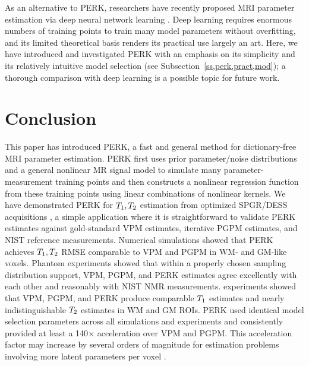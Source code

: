 As an alternative to PERK,
researchers have recently proposed
MRI parameter estimation 
via deep neural network learning
\cite{cohen:17:dlf-arxiv,virtue:17:btr}.
Deep learning requires 
enormous numbers of training points
to train many model parameters without overfitting,
and its limited theoretical basis
renders its practical use largely an art.
Here,
we have introduced and investigated PERK
with an emphasis on its simplicity
and its relatively intuitive model selection
(see Subsection~\ref{ss,perk,pract,mod});
a thorough comparison
with deep learning 
is a possible topic for future work.

\section{Conclusion}
\label{s,perk,conc}

This paper has introduced PERK,
a fast and general method
for dictionary-free MRI parameter estimation.
PERK first uses prior parameter/noise distributions
and a general nonlinear MR signal model
to simulate many parameter-measurement training points
and then constructs a nonlinear regression function 
from these training points
using linear combinations of nonlinear kernels. 
We have demonstrated PERK
for $T_1,T_2$ estimation 
from optimized SPGR/DESS acquisitions \cite{nataraj:17:oms},
a simple application
where it is straightforward
to validate PERK estimates
against gold-standard VPM estimates,
iterative PGPM estimates,
and NIST reference measurements.
Numerical simulations showed
that PERK achieves $T_1,T_2$ RMSE comparable to VPM and PGPM
in WM- and GM-like voxels.
Phantom experiments showed
that within a properly chosen sampling distribution support,
VPM, PGPM, and PERK estimates agree excellently 
with each other
and reasonably with NIST NMR measurements.
\Invivo experiments showed
that VPM, PGPM, and PERK produce comparable $T_1$ estimates
and nearly indistinguishable $T_2$ estimates
in WM and GM ROIs.
PERK used identical model selection parameters
across all simulations and experiments
and consistently provided 
at least a 140$\times$ acceleration over VPM and PGPM.
This acceleration factor may increase
by several orders of magnitude
for estimation problems
involving more latent parameters per voxel
\cite{nataraj:17:dfm, nataraj:17:mwf}.
